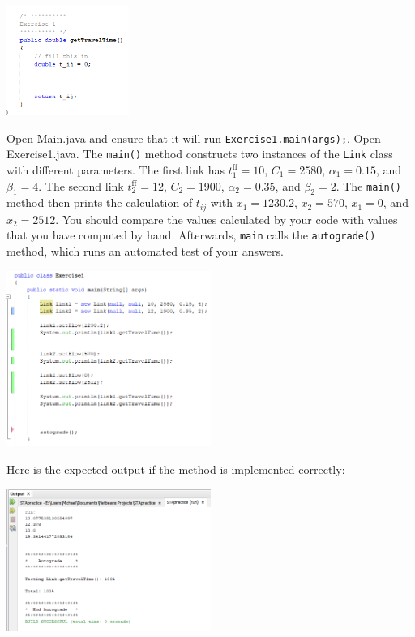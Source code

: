 \documentclass[12pt]{article}
\begin{document}
	\begin{center}
		\includegraphics[width=0.3\textwidth]{netbeans3.png}
	\end{center}

\noindent Open Main.java and ensure that it will run \texttt{Exercise1.main(args);}.
Open Exercise1.java. The \texttt{main()} method constructs two instances of the \texttt{Link} class with different parameters. The first link has $t^{\mathrm{ff}}_{1}=10$, $C_{1}=2580$, $\alpha_{1}=0.15$, and $\beta_{1}=4$. The second link $t^{\mathrm{ff}}_{2}=12$, $C_{2}=1900$, $\alpha_{2}=0.35$, and $\beta_{2}=2$. The \texttt{main()} method then prints the calculation of $t_{ij}$ with $x_{1}=1230.2$, $x_2=570$, $x_1=0$, and $x_2=2512$. You should compare the values calculated by your code with values that you have computed by hand. 
Afterwards, \texttt{main} calls the \texttt{autograde()} method, which runs an automated test of your answers. 
	
	
	\begin{center}
	\includegraphics[width=0.5\textwidth]{netbeans4.png}
\end{center}
	
Here is the expected output if the method is implemented correctly:


	\begin{center}
	\includegraphics[width=0.5\textwidth]{netbeans5.png}
\end{center}	
	
\end{document}
